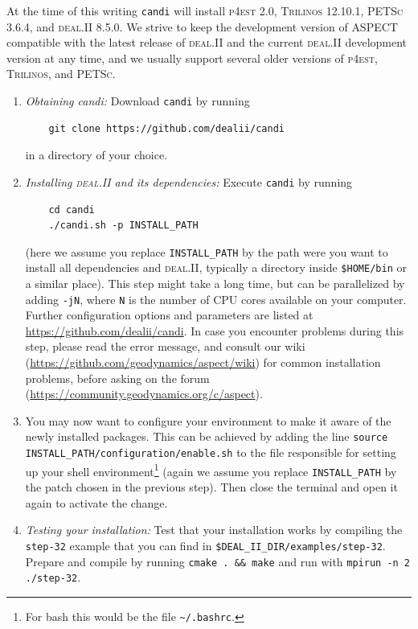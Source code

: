 \documentclass{article}
\newcommand{\dealii}{{\textsc{deal.II}}}
\newcommand{\pfrst}{{\normalfont\textsc{p4est}}}
\newcommand{\trilinos}{{\textsc{Trilinos}}}
\newcommand{\petsc}{{\textsc{PETSc}}}
\newcommand{\aspect}{\textsc{ASPECT}}
\begin{document}
At the time of this writing \texttt{candi} will install \pfrst{} 2.0,
\trilinos{} 12.10.1,  \petsc{} 3.6.4, and \dealii{} 8.5.0. 
We strive to keep the development version of \aspect{} compatible with 
the latest release of \dealii{} and the current \dealii{} development 
version at any time, and we usually support several older versions of
\pfrst{}, \trilinos{}, and \petsc{}.

\begin{enumerate}
\item \textit{Obtaining candi:} Download \texttt{candi} by running 
    \begin{verbatim}
    git clone https://github.com/dealii/candi
    \end{verbatim} 
    in a directory of your choice. 

\item \textit{Installing \dealii{} and its dependencies:} Execute \texttt {candi} by running
    \begin{verbatim}
    cd candi
    ./candi.sh -p INSTALL_PATH
    \end{verbatim} 
    (here we assume you replace \texttt{INSTALL\_PATH} by the path were
    you want to install all dependencies and \dealii{}, typically a directory inside
    \texttt{\$HOME/bin} or a similar place). 
    This step might take a long time, but can be parallelized by adding 
    \texttt{-jN}, where 
    \texttt{N} is the number of CPU cores available on your computer. Further configuration options 
    and parameters are listed at \url{https://github.com/dealii/candi}. In case you encounter
    problems during this step, please read the error message, and consult our wiki
    (\url{https://github.com/geodynamics/aspect/wiki}) for common installation problems,
    before asking on the forum (\url{https://community.geodynamics.org/c/aspect}).

\item You may now want to configure your environment to make it aware of the newly installed
    packages. This can be achieved by adding the line 
    \texttt{source INSTALL\_PATH/configuration/enable.sh} to the file responsible for setting
    up your shell environment\footnote{For bash this would be the file \texttt{\~{}/.bashrc}.} 
    (again we assume you replace \texttt{INSTALL\_PATH} by the patch chosen in the previous step).
    Then close the terminal and open it again to activate the change.

\item \textit{Testing your installation:} Test that your installation works
  by compiling the {\texttt{step-32}} example that you can find in
  {\texttt{\$DEAL\_II\_DIR/examples/step-32}}. Prepare and compile by running {\texttt{cmake . \&\& make}} 
  and run with {\texttt{mpirun -n 2 ./step-32}}.

\end{enumerate}
\end{document}
